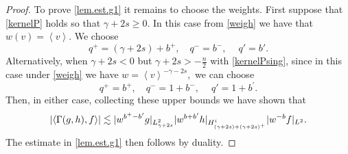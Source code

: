 \documentclass{amsart}
\numberwithin{equation}{section}
\begin{document}
\begin{proof}
To prove \eqref{lem.est.g1} it remains to choose the weights.   
First suppose that \eqref{kernelP} holds so that $\gamma + 2s \ge 0$.  In this case from \eqref{weigh} we have that $w(v)= { \left< {{v}} \right> }$.  We choose
$$
{q}^+ = (\gamma+2s) +{b}^+,
\quad
{q}^- = {b}^-,
\quad\
{q}' = {b}'.
$$
Alternatively, when $\gamma + 2s < 0$ but $\gamma + 2s > -\frac{n}{2}$ with \eqref{kernelPsing}, since in this case under \eqref{weigh} we have
$
w={ \left< {v} \right> }^{-\gamma-2s},
$
we can choose 
\begin{equation}
{q}^+ =  {b}^+,
\quad
{q}^- = 1+{b}^-,
\quad\
{q}' =1+ {b}^\prime.
\label{exp.neg}
\end{equation}
Then, in either case, collecting these upper bounds we have shown that
\begin{equation}
\left| { \left< {{\Gamma(g,h),f}} \right> } \right|
\lesssim
{|} w^{ {b}^+ - {b}^\prime}  g{|}_{L^2_{\gamma  + 2s}}  
{|} w^{ {b} + {b}^\prime}  h{|}_{H^{i}_{(\gamma+2s)+(\gamma+2s)^+ }}
{|} w^{ -{b}}  f{|}_{L^{2}}.
\notag
\end{equation}
The estimate in \eqref{lem.est.g1} then follows by duality.  


\end{proof}
\end{document}

